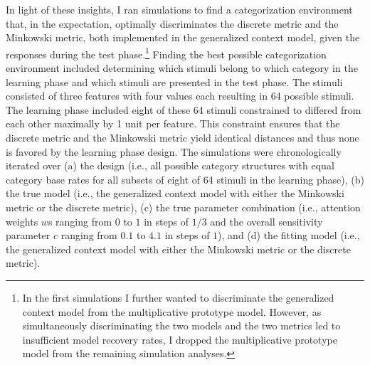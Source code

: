 \documentclass[a4paper,man,natbib]{apa6}
\begin{document}
In light of these insights, I ran simulations to find a categorization environment that, in the expectation, optimally discriminates the discrete metric and the Minkowski metric, both implemented in the generalized context model, given the responses during the test phase.\footnote{In the first simulations I further wanted to discriminate the generalized context model from the multiplicative prototype model. However, as simultaneously discriminating the two models and the two metrics led to insufficient model recovery rates, I dropped the multiplicative prototype model from the remaining simulation analyses.} Finding the best possible categorization environment included determining which stimuli belong to which category in the learning phase and which stimuli are presented in the test phase. The stimuli consisted of three features with four values each resulting in 64 possible stimuli. The learning phase included eight of these 64 stimuli constrained to differed from each other maximally by 1 unit per feature. This constraint ensures that the discrete metric and the Minkowski metric yield identical distances and thus none is favored by the learning phase design. The simulations were chronologically iterated over (a) the design (i.e., all possible category structures with equal category base rates for all subsets of eight of 64 stimuli in the learning phase), (b) the true model (i.e., the generalized context model with either the Minkowski metric or the discrete metric), (c) the true parameter combination (i.e., attention weights $w$s ranging from $0$ to $1$ in steps of $1/3$ and the overall sensitivity parameter $c$ ranging from $0.1$ to $4.1$ in steps of $1$), and (d) the fitting model (i.e., the generalized context model with either the Minkowski metric or the discrete metric).
\end{document}
